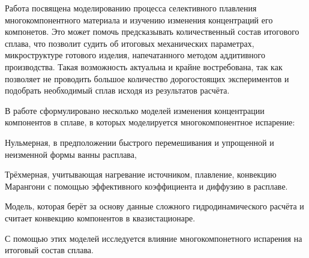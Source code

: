 
Работа посвящена моделированию процесса селективного плавления 
многокомпонентного материала и изучению изменения концентраций 
его компонетов. Это может помочь предсказывать количественный 
состав итогового сплава, что позволит судить об итоговых механических 
параметрах, микроструктуре готового изделия, напечатанного методом 
аддитивного производства. Такая возможность актуальна и крайне востребована, 
так как позволяет не проводить большое количество дорогостоящих экспериментов 
и подобрать необходимый сплав исходя из результатов расчёта.

В работе сформулировано несколько моделей изменения концентрации компонентов 
в сплаве, в которых моделируется многокомпонентное испарение:

Нульмерная, в предположении быстрого перемешивания и упрощенной и неизменной формы ванны расплава, 

Трёхмерная, учитывающая нагревание источником, плавление, конвекцию Марангони с помощью эффективного коэффициента и диффузию в расплаве.

Модель, которая берёт за основу данные сложного гидродинамического расчёта и считает конвекцию компонентов в квазистационаре.

С помощью этих моделей исследуется влияние многокомпонетного испарения на итоговый состав сплава.

\clearpage